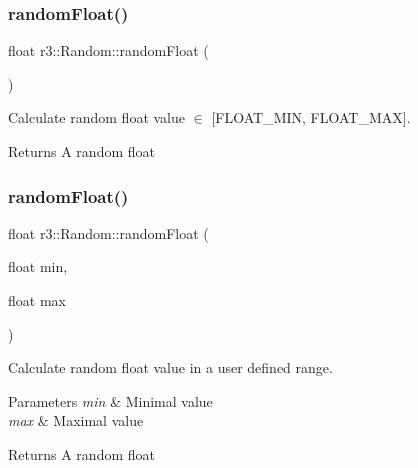 \subsubsection{\texorpdfstring{random\+Float()}{randomFloat()}\hspace{0.1cm}{\footnotesize\ttfamily [1/2]}}
{\footnotesize\ttfamily float r3\+::\+Random\+::random\+Float (\begin{DoxyParamCaption}{ }\end{DoxyParamCaption})\hspace{0.3cm}{\ttfamily [static]}}



Calculate random float value $\in$ \mbox{[}F\+L\+O\+A\+T\+\_\+\+M\+IN, F\+L\+O\+A\+T\+\_\+\+M\+AX\mbox{]}. 

\begin{DoxyReturn}{Returns}
A random float 
\end{DoxyReturn}
\mbox{\label{classr3_1_1_random_a37e0fe288d26258964bb724c7335446c}} 
\subsubsection{\texorpdfstring{random\+Float()}{randomFloat()}\hspace{0.1cm}{\footnotesize\ttfamily [2/2]}}
{\footnotesize\ttfamily float r3\+::\+Random\+::random\+Float (\begin{DoxyParamCaption}\item[{float}]{min,  }\item[{float}]{max }\end{DoxyParamCaption})\hspace{0.3cm}{\ttfamily [static]}}



Calculate random float value in a user defined range. 


\begin{DoxyParams}{Parameters}
{\em min} & Minimal value \\
\hline
{\em max} & Maximal value \\
\hline
\end{DoxyParams}
\begin{DoxyReturn}{Returns}
A random float 
\end{DoxyReturn}
\mbox{\label{classr3_1_1_random_af56217d8a7b64eec4fec0f4047e49075}} 
